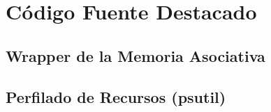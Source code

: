 
\chapter{Código Fuente Destacado}


\section{Wrapper de la Memoria Asociativa}

\section{Perfilado de Recursos (psutil)}
